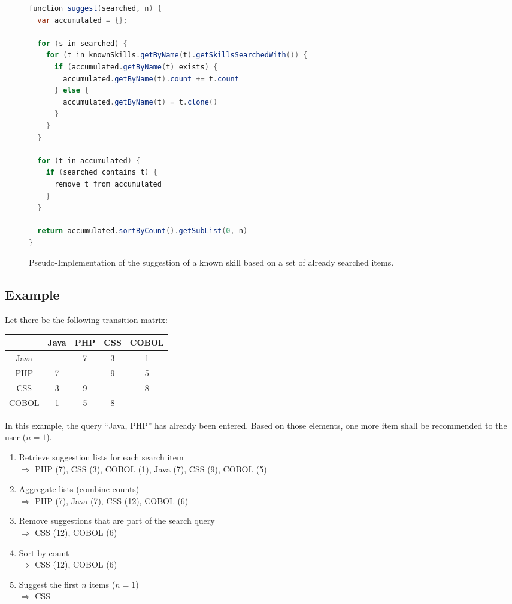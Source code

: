 \newpage

\begin{figure}[!htp]
\begin{lstlisting}[language=Java]
function suggest(searched, n) {
  var accumulated = {};

  for (s in searched) {
    for (t in knownSkills.getByName(t).getSkillsSearchedWith()) {
      if (accumulated.getByName(t) exists) {
        accumulated.getByName(t).count += t.count
      } else {
        accumulated.getByName(t) = t.clone()
      }
    }
  }

  for (t in accumulated) {
    if (searched contains t) {
      remove t from accumulated
    }
  }

  return accumulated.sortByCount().getSubList(0, n)
}

\end{lstlisting}
\caption[Pseudocode: Skill Suggestion Algorithm]{Pseudo-Implementation of the suggestion of a known skill based on a set of already searched items.}
\end{figure}

\newpage

\subsection{Example}
Let there be the following transition matrix:

\begin{center}
\begin{tabular}{c | c |c | c | c}
		  & Java & PHP & CSS & COBOL\\
	\hline
	Java  &  -   &  7  &  3  &   1  \\
	\hline
	PHP   &  7   &  -  &  9  &   5  \\
	\hline
	CSS   &  3   &  9  &  -  &   8  \\
	\hline
	COBOL &  1   &  5  &  8  &   -  \\
\end{tabular}
\end{center}

In this example, the query ``Java, PHP'' has already been entered. Based on those elements, one more item shall be recommended to the user ($n = 1$).
\begin{enumerate}
	\item Retrieve suggestion lists for each search item\\
		$\Rightarrow$ PHP (7), CSS (3), COBOL (1), Java (7), CSS (9), COBOL (5)
	\item Aggregate lists (combine counts)\\
		$\Rightarrow$ PHP (7), Java (7), CSS (12), COBOL (6)
	\item Remove suggestions that are part of the search query\\
		$\Rightarrow$ CSS (12), COBOL (6)
	\item Sort by count\\
		$\Rightarrow$ CSS (12), COBOL (6)
	\item Suggest the first $n$ items ($n = 1$)\\
		$\Rightarrow$ CSS
\end{enumerate}


